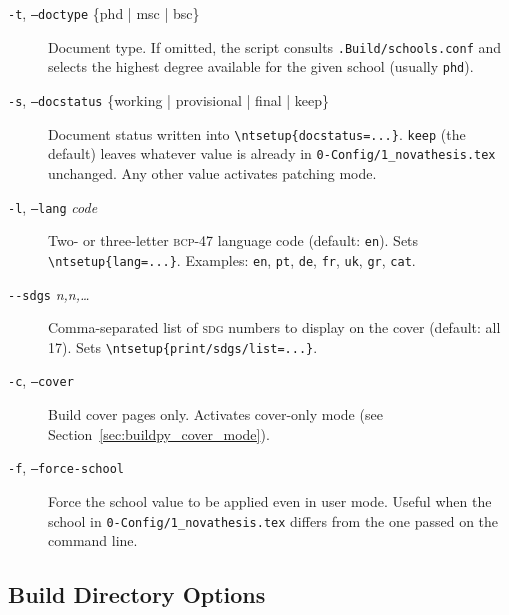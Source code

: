 \begin{description}
  \item[\texttt{-t}, \texttt{--doctype} \{phd | msc | bsc\}]
        Document type.  If omitted, the script consults
        \verb!.Build/schools.conf! and selects the highest degree available
        for the given school (usually \texttt{phd}).

  \item[\texttt{-s}, \texttt{--docstatus} \{working | provisional | final | keep\}]
        Document status written into \verb!\ntsetup{docstatus=...}!.
        \texttt{keep} (the default) leaves whatever value is already in
        \verb!0-Config/1_novathesis.tex! unchanged.  Any other value
        activates patching mode.

  \item[\texttt{-l}, \texttt{--lang} \textit{code}]
        Two- or three-letter \textsc{bcp-47} language code (default:
        \texttt{en}).  Sets \verb!\ntsetup{lang=...}!.  Examples:
        \texttt{en}, \texttt{pt}, \texttt{de}, \texttt{fr}, \texttt{uk},
        \texttt{gr}, \texttt{cat}.

  \item[\texttt{-{}-sdgs} \textit{n,n,\ldots}]
        Comma-separated list of \textsc{sdg} numbers to display on the cover
        (default: all 17).  Sets \verb!\ntsetup{print/sdgs/list=...}!.

  \item[\texttt{-c}, \texttt{--cover}]
        Build cover pages only.  Activates cover-only mode (see
        Section~\ref{sec:buildpy_cover_mode}).

  \item[\texttt{-f}, \texttt{--force-school}]
        Force the school value to be applied even in user mode.  Useful when
        the school in \verb!0-Config/1_novathesis.tex! differs from the one
        passed on the command line.
\end{description}

\subsection{Build Directory Options}
\label{sec:buildpy_bdir_opts}

